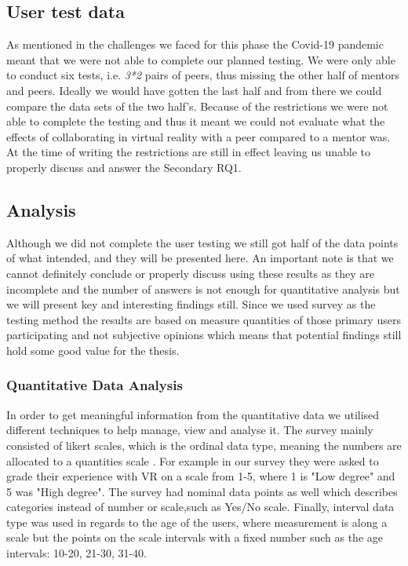 \subsection{User test data}
As mentioned in the challenges we faced for this phase the Covid-19 pandemic meant that we were not able to complete our planned testing. We were only able to conduct six tests, i.e. \textit{3*2} pairs of peers, thus missing the other half of mentors and peers. Ideally we would have gotten the last half and from there we could  compare the data sets of the two half's. Because of the restrictions we were not able to complete the testing and thus it meant we could not evaluate what the effects of collaborating in virtual reality with a peer compared to a mentor was. At the time of writing the restrictions are still in effect leaving us unable to properly discuss and answer the Secondary RQ1.     


\subsection{Analysis}
Although we did not complete the user testing we still got half of the data points of what intended, and they will be presented here. An important note is that we cannot definitely conclude or properly discuss using these results as they are incomplete and the number of answers is not enough for quantitative analysis but we will present key and interesting findings still. Since we used survey as the testing method the results are based on measure quantities of those primary users participating and not subjective opinions which means that potential findings still hold some good value for the thesis.       

\subsubsection{Quantitative Data Analysis}
In order to get meaningful information from the quantitative data we utilised different techniques to help manage, view and analyse it. The survey mainly consisted of likert scales, which is the ordinal data type, meaning the numbers are allocated to a quantities scale \cite{oates2005researching}. For example in our survey they were asked to grade their experience with VR on a scale from 1-5, where 1 is "Low degree" and 5 was "High degree". The survey had nominal data points as well which describes categories instead of number or scale,such as Yes/No scale. Finally, interval data type was used in regards to the age of the users, where measurement is along a scale but the points on the scale intervals with a fixed number such as the age intervals: 10-20, 21-30, 31-40. 

